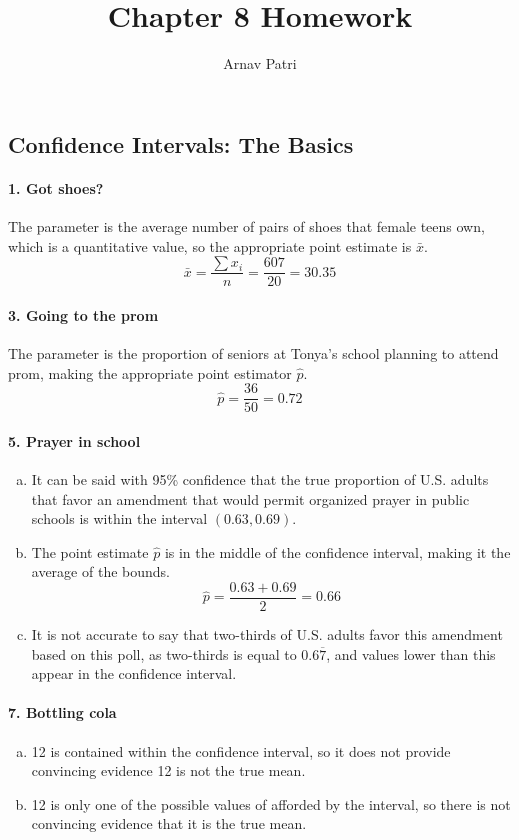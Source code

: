 \documentclass[12pt, A4]{article}
\title{Chapter 8 Homework}
\author{Arnav Patri}
\begin{document}
	\maketitle
	\setcounter{section}{8}
	\subsection{Confidence Intervals: The Basics}
		\paragraph{1. Got shoes?}
			The parameter is the average number of pairs of shoes that female teens own, which is a quantitative value, so the appropriate point estimate is $\bar{x}$.
			\[
				\bar{x} = \frac{\sum x_i}{n} = \frac{607}{20} = 30.35
			\]
		\paragraph{3. Going to the prom}
			The parameter is the proportion of seniors at Tonya's school planning to attend prom, making the appropriate point estimator $\hat{p}$.
			\[
				\hat{p} = \frac{36}{50} = 0.72
			\]
		\paragraph{5. Prayer in school}
			\begin{enumerate}[a.]
				\item
					It can be said with 95\% confidence that the true proportion of U.S. adults that favor an amendment that would permit organized prayer in public schools is within the interval $(0.63, 0.69)$.
				\item
					The point estimate $\hat{p}$ is in the middle of the confidence interval, making it the average of the bounds.
					\[
						\hat{p} = \frac{0.63 + 0.69}{2} = 0.66
					\]
				\item
					It is not accurate to say that two-thirds of U.S. adults favor this amendment based on this poll, as two-thirds is equal to $0.6\overline{7}$, and values lower than this appear in the confidence interval.
			\end{enumerate}
		\paragraph{7. Bottling cola}
			\begin{enumerate}[a.]
				\item
					12 is contained within the confidence interval, so it does not provide convincing evidence 12 is not the true mean.
				\item
					12 is only one of the possible values of afforded by the interval, so there is not convincing evidence that it is the true mean.
			\end{enumerate}
\end{document}

